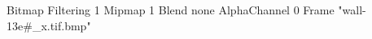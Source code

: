 {Bitmap
	{Filtering 1}
	{Mipmap 1}
	{Blend none}
	{AlphaChannel 0}
	{Frame "wall-13e#_x.tif.bmp"}
}
